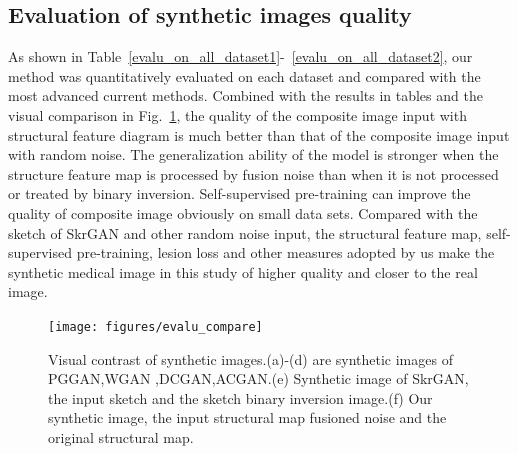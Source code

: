 \documentclass[runningheads]{llncs}
\begin{document}
	\subsection{Evaluation of synthetic images quality }
	As shown in Table~\ref{evalu_on_all_dataset1}-~\ref{evalu_on_all_dataset2}, our method was quantitatively evaluated on each dataset and compared with the most advanced current methods. Combined with the results in tables and the visual comparison in Fig.~\ref{evalu_compare}, the quality of the composite image input with structural feature diagram is much better than that of the composite image input with random noise. The generalization ability of the model is stronger when the structure feature map is processed by fusion noise than when it is not processed or treated by binary inversion. Self-supervised pre-training can improve the quality of composite image obviously on small data sets. Compared with the sketch of SkrGAN and other random noise input, the structural feature map, self-supervised pre-training, lesion loss and other measures adopted by us make the synthetic medical image in this study of higher quality and closer to the real image.
	\begin{figure}
		\centering
		\texttt{[image: figures/evalu\_compare]}
		\caption{Visual contrast of synthetic images.(a)-(d) are synthetic images of PGGAN\cite{100karras2017progressive,96zhang2019skrgan:},WGAN \cite{99arjovsky2017wasserstein,96zhang2019skrgan:},DCGAN\cite{97radford2015unsupervised,96zhang2019skrgan:},ACGAN\cite{98odena2016conditional,96zhang2019skrgan:}.(e) Synthetic image of SkrGAN\cite{96zhang2019skrgan:}, the input sketch and the sketch binary inversion image.(f) Our synthetic image, the input structural map fusioned noise and the original structural map.}
		\label{evalu_compare}
	\end{figure}
\end{document}
